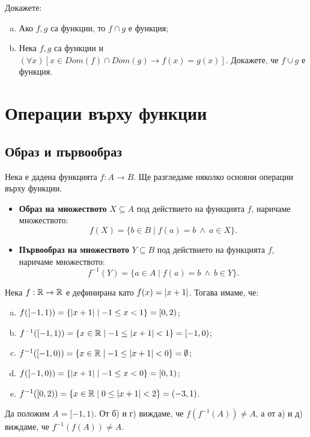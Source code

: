 \begin{problem}
  Докажете:
  \begin{enumerate}[a)]
  \item
    Ако $f,g$ са функции, то $f\cap g$ е функция;
  \item
    Нека $f,g$ са функции и $(\forall x)[x\in Dom(f)\cap Dom(g)\rightarrow f(x) = g(x)]$.
    Докажете, че $f\cup g$ е функция.
  \end{enumerate}
\end{problem}

\section{Операции върху функции}


\subsection*{Образ и първообраз}
Нека е дадена функцията $f:A\to B$.
Ще разгледаме няколко основни операции върху функции.

\begin{itemize}
\item 
  {\bf Образ на множеството} $X\subseteq A$ под действието на функцията $f$, наричаме
  множеството: \[f(X) = \{b\in B \mid f(a) = b\ \wedge\ a \in X\}.\]
\item
  {\bf Първообраз на множеството} $Y\subseteq B$ под действието на функцията $f$, наричаме
  множеството: \[f^{-1}(Y) = \{a\in A \mid f(a) = b\ \wedge\ b \in Y\}.\]
\end{itemize}


\begin{example}
  Нека $f:\mathbb{R}\to\mathbb{R}$ е дефинирана като $f(x) = \lvert{x+1}\rvert$.
  Тогава имаме, че:  
  \begin{enumerate}[a)]
  \item
    $f([-1,1)) = \{\lvert{x+1}\rvert \mid -1 \leq x < 1\} = [0, 2)$;
  \item
    $f^{-1}([-1,1)) = \{x\in\mathbb{R}\mid -1 \leq \lvert{x+1}\rvert < 1\} = [-1,0)$;
  \item
    $f^{-1}([-1,0)) = \{x \in \mathbb{R} \mid -1 \leq \lvert{x+1}\rvert < 0\} = \emptyset$;
  \item
    $f([-1,0)) = \{\lvert{x+1}\rvert \mid -1 \leq x < 0\} = [0, 1)$;
  \item
    $f^{-1}([0,2)) = \{x \in \mathbb{R} \mid 0 \leq \lvert{x+1}\rvert < 2\} = (-3, 1)$.
  \end{enumerate}
  Да положим $A = [-1,1)$. 
  От б) и г) виждаме, че $f(f^{-1}(A)) \neq A$, а от 
  а) и д) виждаме, че $f^{-1}(f(A)) \neq A$.
\end{example}


